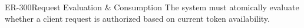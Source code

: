 \begin{equipmentrequirement}{ER-300}{Request Evaluation \& Consumption}
    The system must atomically evaluate whether a client request is authorized based on current token availability.
\end{equipmentrequirement}